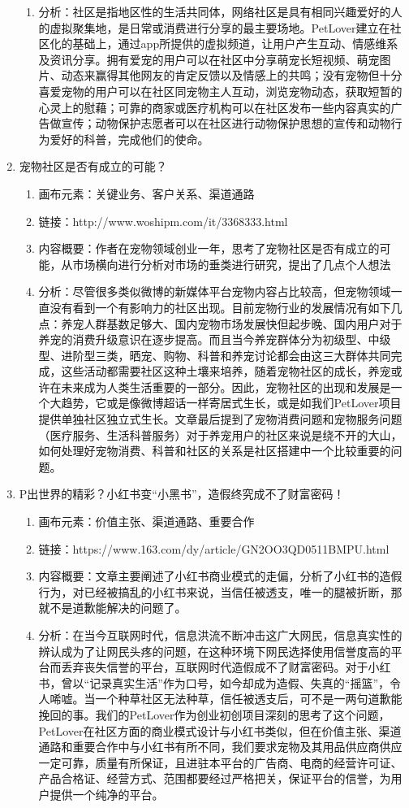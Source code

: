 \documentclass[a4paper]{ctexart}
\begin{document}
\begin{enumerate}[label=\alph*.]
\begin{enumerate}[label=\alph*.]
    \item 分析：社区是指地区性的生活共同体，网络社区是具有相同兴趣爱好的人的虚拟聚集地，是日常或消费进行分享的最主要场地。PetLover建立在社区化的基础上，通过app所提供的虚拟频道，让用户产生互动、情感维系及资讯分享。拥有爱宠的用户可以在社区中分享萌宠长短视频、萌宠图片、动态来赢得其他网友的肯定反馈以及情感上的共鸣；没有宠物但十分喜爱宠物的用户可以在社区同宠物主人互动，浏览宠物动态，获取短暂的心灵上的慰藉；可靠的商家或医疗机构可以在社区发布一些内容真实的广告做宣传；动物保护志愿者可以在社区进行动物保护思想的宣传和动物行为爱好的科普，完成他们的使命。
  \end{enumerate}
  \item 宠物社区是否有成立的可能？
  \begin{enumerate}[label=\alph*.]
    \item 画布元素：关键业务、客户关系、渠道通路
    \item 链接：http://www.woshipm.com/it/3368333.html
    \item 内容概要：作者在宠物领域创业一年，思考了宠物社区是否有成立的可能，从市场横向进行分析对市场的垂类进行研究，提出了几点个人想法
    \item 分析：尽管很多类似微博的新媒体平台宠物内容占比较高，但宠物领域一直没有看到一个有影响力的社区出现。目前宠物行业的发展情况有如下几点：养宠人群基数足够大、国内宠物市场发展快但起步晚、国内用户对于养宠的消费升级意识在逐步提高。而且当今养宠群体分为初级型、中级型、进阶型三类，晒宠、购物、科普和养宠讨论都会由这三大群体共同完成，这些活动都需要社区这种土壤来培养，随着宠物社区的成长，养宠或许在未来成为人类生活重要的一部分。因此，宠物社区的出现和发展是一个大趋势，它或是像微博超话一样寄居式生长，或是如我们PetLover项目提供单独社区独立式生长。文章最后提到了宠物消费问题和宠物服务问题（医疗服务、生活科普服务）对于养宠用户的社区来说是绕不开的大山，如何处理好宠物消费、科普和社区的关系是社区搭建中一个比较重要的问题。
  \end{enumerate}
  \item P出世界的精彩？小红书变“小黑书”，造假终究成不了财富密码！
  \begin{enumerate}[label=\alph*.]
    \item 画布元素：价值主张、渠道通路、重要合作
    \item 链接：https://www.163.com/dy/article/GN2OO3QD0511BMPU.html
    \item 内容概要：文章主要阐述了小红书商业模式的走偏，分析了小红书的造假行为，对已经被搞乱的小红书来说，当信任被透支，唯一的腿被折断，那就不是道歉能解决的问题了。
    \item 分析：在当今互联网时代，信息洪流不断冲击这广大网民，信息真实性的辨认成为了让网民头疼的问题，在这种环境下网民选择使用信誉度高的平台而丢弃丧失信誉的平台，互联网时代造假成不了财富密码。对于小红书，曾以“记录真实生活”作为口号，如今却成为造假、失真的“摇篮”，令人唏嘘。当一个种草社区无法种草，信任被透支后，可不是一两句道歉能挽回的事。我们的PetLover作为创业初创项目深刻的思考了这个问题，PetLover在社区方面的商业模式设计与小红书类似，但在价值主张、渠道通路和重要合作中与小红书有所不同，我们要求宠物及其用品供应商供应一定可靠，质量有所保证，且进驻本平台的广告商、电商的经营许可证、产品合格证、经营方式、范围都要经过严格把关，保证平台的信誉，为用户提供一个纯净的平台。

\end{enumerate}
\end{enumerate}
\end{document}

